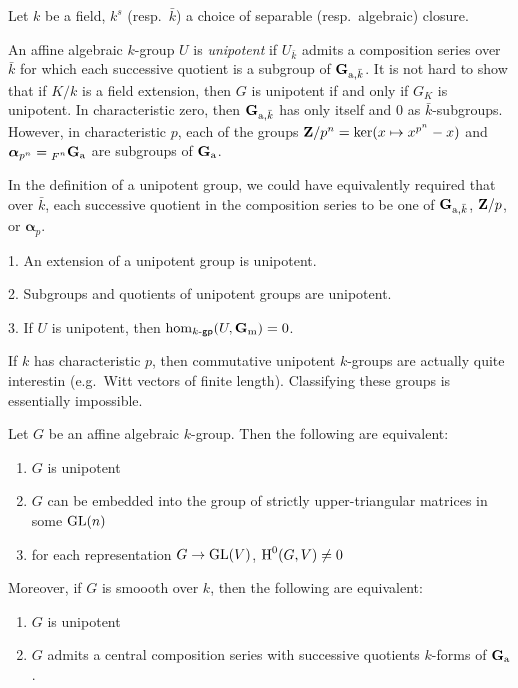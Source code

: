 \documentclass{article}
\begin{document}
Let $k$ be a field, $k^s$ (resp.\ $\bar k$) a choice of separable (resp.\ algebraic) 
closure. 

An affine algebraic $k$-group $U$ is \emph{unipotent} if $U_{\bar k}$ admits 
a composition series over $\bar k$ for which each successive quotient is a subgroup 
of $\mathbf{G}_{\mathrm{a}, \bar k}$. It is not hard to show that if $K/k$ is a field 
extension, then $G$ is unipotent if and only if $G_K$ is unipotent. In 
characteristic zero, then $\mathbf{G}_{\mathrm{a},\bar k}$ has only itself and $0$ as 
$\bar k$-subgroups. However, in characteristic $p$, each of the groups 
$\mathbf{Z}/p^n = \ker(x\mapsto x^{p^n}-x)$ and 
$\boldsymbol\alpha_{p^n} = \prescript{}{F^n}{\mathbf{G}_{\mathrm{a}}}$ are subgroups of 
$\mathbf{G}_{\mathrm{a}}$. 

In the definition of a unipotent group, we could have equivalently required that 
over $\bar k$, each successive quotient in the composition series to be one of 
$\mathbf{G}_{\mathrm{a},\bar k}$, $\mathbf{Z}/p$, or $\boldsymbol\alpha_p$. 

\begin{lemma}
1. An extension of a unipotent group is unipotent. 

2. Subgroups and quotients of unipotent groups are unipotent. 

3. If $U$ is unipotent, then $\hom_{k\textnormal{-}\mathsf{gp}}(U,\mathbf{G}_{\mathrm{m}}) = 0$. 
\end{lemma}

If $k$ has characteristic $p$, then commutative unipotent $k$-groups are 
actually quite interestin (e.g.\ Witt vectors of finite length). Classifying 
these groups is essentially impossible. 

\begin{proposition}
Let $G$ be an affine algebraic $k$-group. Then the following are equivalent: 
\begin{enumerate}
  \item $G$ is unipotent 
  \item $G$ can be embedded into the group of strictly upper-triangular 
    matrices in some $\operatorname{GL}(n)$
  \item for each representation $G\to \operatorname{GL}(V)$, $\operatorname{H}^0(G,V)\ne 0$
\end{enumerate}
Moreover, if $G$ is smoooth over $k$, then the following are equivalent:
\begin{enumerate}
  \item $G$ is unipotent
  \item $G$ admits a central composition series with successive quotients 
    $k$-forms of $\mathbf{G}_{\mathrm{a}}$. 
\end{enumerate}
\end{proposition}
\end{document}
